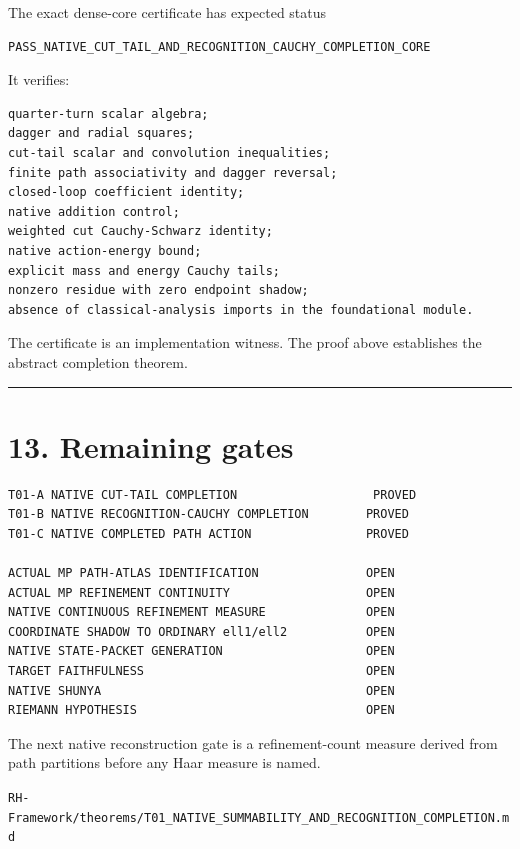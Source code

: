 The exact dense-core certificate has expected status

\begin{verbatim}
PASS_NATIVE_CUT_TAIL_AND_RECOGNITION_CAUCHY_COMPLETION_CORE
\end{verbatim}

It verifies:

\begin{verbatim}
quarter-turn scalar algebra;
dagger and radial squares;
cut-tail scalar and convolution inequalities;
finite path associativity and dagger reversal;
closed-loop coefficient identity;
native addition control;
weighted cut Cauchy-Schwarz identity;
native action-energy bound;
explicit mass and energy Cauchy tails;
nonzero residue with zero endpoint shadow;
absence of classical-analysis imports in the foundational module.
\end{verbatim}

The certificate is an implementation witness. The proof above establishes the
abstract completion theorem.

\begin{center}\rule{0.5\linewidth}{0.5pt}\end{center}

\hypertarget{remaining-gates}{%
\section{13. Remaining gates}\label{remaining-gates}}

\begin{verbatim}
T01-A NATIVE CUT-TAIL COMPLETION                   PROVED
T01-B NATIVE RECOGNITION-CAUCHY COMPLETION        PROVED
T01-C NATIVE COMPLETED PATH ACTION                PROVED

ACTUAL MP PATH-ATLAS IDENTIFICATION               OPEN
ACTUAL MP REFINEMENT CONTINUITY                   OPEN
NATIVE CONTINUOUS REFINEMENT MEASURE              OPEN
COORDINATE SHADOW TO ORDINARY ell1/ell2           OPEN
NATIVE STATE-PACKET GENERATION                    OPEN
TARGET FAITHFULNESS                               OPEN
NATIVE SHUNYA                                     OPEN
RIEMANN HYPOTHESIS                                OPEN
\end{verbatim}

The next native reconstruction gate is a refinement-count measure derived from
path partitions before any Haar measure is named.

\begin{flushright}\small\texttt{RH-Framework/theorems/T01\_NATIVE\_SUMMABILITY\_AND\_RECOGNITION\_COMPLETION.md}\end{flushright}
